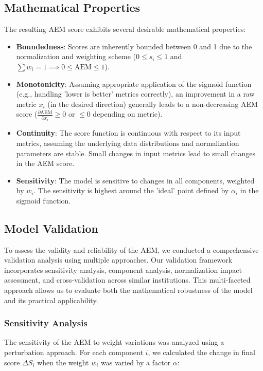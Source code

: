 \documentclass[12pt]{article}
\begin{document}
\subsection{Mathematical Properties}
The resulting AEM score exhibits several desirable mathematical properties:
\begin{itemize}
    \item \textbf{Boundedness}: Scores are inherently bounded between 0 and 1 due to the normalization and weighting scheme ($0 \leq s_i \leq 1$ and $\sum w_i = 1 \implies 0 \leq \text{AEM} \leq 1$).
    \item \textbf{Monotonicity}: Assuming appropriate application of the sigmoid function (e.g., handling 'lower is better' metrics correctly), an improvement in a raw metric $x_i$ (in the desired direction) generally leads to a non-decreasing AEM score ($\frac{\partial \text{AEM}}{\partial x_i} \ge 0$ or $\le 0$ depending on metric).
    \item \textbf{Continuity}: The score function is continuous with respect to its input metrics, assuming the underlying data distributions and normalization parameters are stable. Small changes in input metrics lead to small changes in the AEM score.
    \item \textbf{Sensitivity}: The model is sensitive to changes in all components, weighted by $w_i$. The sensitivity is highest around the 'ideal' point defined by $\alpha_i$ in the sigmoid function.
\end{itemize}

\subsection{Model Validation}

To assess the validity and reliability of the AEM, we conducted a comprehensive validation analysis using multiple approaches. Our validation framework incorporates sensitivity analysis, component analysis, normalization impact assessment, and cross-validation across similar institutions. This multi-faceted approach allows us to evaluate both the mathematical robustness of the model and its practical applicability.

\subsubsection{Sensitivity Analysis}

The sensitivity of the AEM to weight variations was analyzed using a perturbation approach. For each component $i$, we calculated the change in final score $\Delta S_i$ when the weight $w_i$ was varied by a factor $\alpha$:
\end{document}
